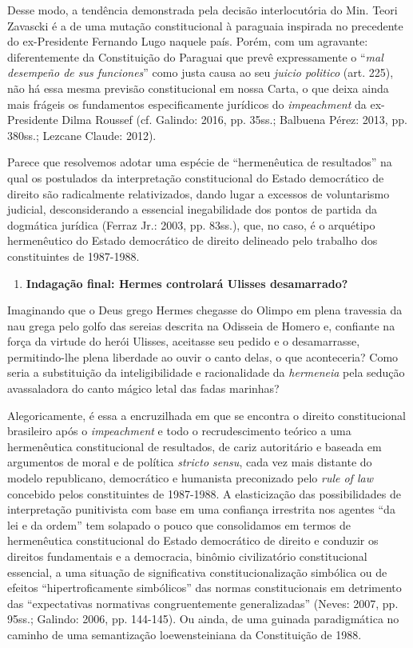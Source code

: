 Desse modo, a tendência demonstrada pela decisão interlocutória do Min.
Teori Zavascki é a de uma mutação constitucional à paraguaia inspirada
no precedente do ex-Presidente Fernando Lugo naquele país. Porém, com um
agravante: diferentemente da Constituição do Paraguai que prevê
expressamente o ``\emph{mal desempeño de sus funciones}'' como justa
causa ao seu \emph{juicio politico} (art. 225), não há essa mesma
previsão constitucional em nossa Carta, o que deixa ainda mais frágeis
os fundamentos especificamente jurídicos do \emph{impeachment} da
ex-Presidente Dilma Roussef (cf. Galindo: 2016, pp. 35ss.; Balbuena
Pérez: 2013, pp. 380ss.; Lezcane Claude: 2012).

Parece que resolvemos adotar uma espécie de ``hermenêutica de
resultados'' na qual os postulados da interpretação constitucional do
Estado democrático de direito são radicalmente relativizados, dando
lugar a excessos de voluntarismo judicial, desconsiderando a essencial
inegabilidade dos pontos de partida da dogmática jurídica (Ferraz Jr.:
2003, pp. 83ss.), que, no caso, é o arquétipo hermenêutico do Estado
democrático de direito delineado pelo trabalho dos constituintes de
1987-1988.

\begin{enumerate}
\def\labelenumi{\arabic{enumi}.}
\item
  \textbf{Indagação final: Hermes controlará Ulisses desamarrado?}
\end{enumerate}

Imaginando que o Deus grego Hermes chegasse do Olimpo em plena travessia
da nau grega pelo golfo das sereias descrita na Odisseia de Homero e,
confiante na força da virtude do herói Ulisses, aceitasse seu pedido e o
desamarrasse, permitindo-lhe plena liberdade ao ouvir o canto delas, o
que aconteceria? Como seria a substituição da inteligibilidade e
racionalidade da \emph{hermeneia} pela sedução avassaladora do canto
mágico letal das fadas marinhas?

Alegoricamente, é essa a encruzilhada em que se encontra o direito
constitucional brasileiro após o \emph{impeachment} e todo o
recrudescimento teórico a uma hermenêutica constitucional de resultados,
de cariz autoritário e baseada em argumentos de moral e de política
\emph{stricto sensu}, cada vez mais distante do modelo republicano,
democrático e humanista preconizado pelo \emph{rule of law} concebido
pelos constituintes de 1987-1988. A elasticização das possibilidades de
interpretação punitivista com base em uma confiança irrestrita nos
agentes ``da lei e da ordem'' tem solapado o pouco que consolidamos em
termos de hermenêutica constitucional do Estado democrático de direito e
conduzir os direitos fundamentais e a democracia, binômio civilizatório
constitucional essencial, a uma situação de significativa
constitucionalização simbólica ou de efeitos ``hipertroficamente
simbólicos'' das normas constitucionais em detrimento das ``expectativas
normativas congruentemente generalizadas'' (Neves: 2007, pp. 95ss.;
Galindo: 2006, pp. 144-145). Ou ainda, de uma guinada paradigmática no
caminho de uma semantização loewensteiniana da Constituição de 1988.

